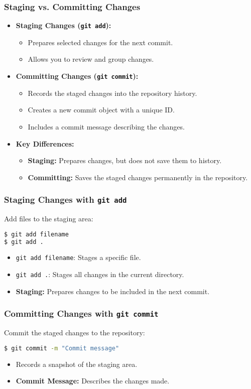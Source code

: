 \begin{frame}
  \frametitle{Staging vs. Committing Changes}
  \begin{itemize}
    \item \textbf{Staging Changes (\texttt{git add}):}
      \begin{itemize}
        \item Prepares selected changes for the next commit.
        \item Allows you to review and group changes.
      \end{itemize}
    \item \textbf{Committing Changes (\texttt{git commit}):}
      \begin{itemize}
        \item Records the staged changes into the repository history.
        \item Creates a new commit object with a unique ID.
        \item Includes a commit message describing the changes.
      \end{itemize}
    \item \textbf{Key Differences:}
      \begin{itemize}
        \item \textbf{Staging:} Prepares changes, but does not save them to history.
        \item \textbf{Committing:} Saves the staged changes permanently in the repository.
      \end{itemize}
  \end{itemize}
\end{frame}

\begin{frame}[fragile]
  \frametitle{Staging Changes with \texttt{git add}}
  Add files to the staging area:
  \begin{lstlisting}[language=bash]
$ git add filename
$ git add .
  \end{lstlisting}
  \begin{itemize}
    \item \texttt{git add filename}: Stages a specific file.
    \item \texttt{git add .}: Stages all changes in the current directory.
    \item \textbf{Staging:} Prepares changes to be included in the next commit.
  \end{itemize}
\end{frame}

\begin{frame}[fragile]
  \frametitle{Committing Changes with \texttt{git commit}}
  Commit the staged changes to the repository:
  \begin{lstlisting}[language=bash]
$ git commit -m "Commit message"
  \end{lstlisting}
  \begin{itemize}
    \item Records a snapshot of the staging area.
    \item \textbf{Commit Message:} Describes the changes made.
  \end{itemize}
\end{frame}

